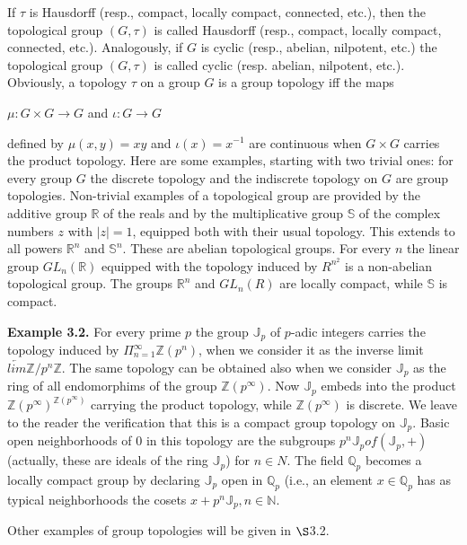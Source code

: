 \documentclass[12pt]{article}
\begin{document}
    If $ \tau $ is Hausdorff (resp., compact, locally compact, connected, etc.), then the topological group $ (G, \tau) $ is
called Hausdorff (resp., compact, locally compact, connected, etc.). Analogously, if $ G $ is cyclic (resp., abelian,
nilpotent, etc.) the topological group $ (G, \tau) $ is called cyclic (resp. abelian, nilpotent, etc.). Obviously, a topology
$ \tau $ on a group $ G $ is a group topology iff the maps 


$ \mu : G\times G \to G $ and $\iota : G \to G$


defined by $ \mu(x, y) = xy $ and $ \iota(x) = x^{-1} $ are continuous when $ G \times G $ carries the product topology.
Here are some examples, starting with two trivial ones: for every group $ G $ the discrete topology and the
indiscrete topology on $ G $ are group topologies. Non-trivial examples of a topological group are provided by the
additive group $ \mathbb{R} $ of the reals and by the multiplicative group $ \mathbb{S} $ of the complex numbers $ z $ with $ |z| = 1 $, equipped
both with their usual topology. This extends to all powers $ \mathbb{R}^n $ and $ \mathbb{S}^n$. These are abelian topological groups.
For every $ n $ the linear group $GL_n (\mathbb{R})$ equipped with the topology induced by $R^{n^2}$ is a non-abelian topological
group. The groups $\mathbb{R}^n$ and $GL_n (R)$ are locally compact, while $\mathbb{S}$ is compact.


\textbf{Example 3.2.} For every prime $ p $ the group $\mathbb{J}_p$ of $p$-adic integers carries the topology induced by $ \Pi^{\infty}_{n=1} \mathbb{Z}(p^n) $,
when we consider it as the inverse limit $\underleftarrow{lim} \mathbb{Z}/p^n \mathbb{Z}$. The same topology can be obtained also when we consider $\mathbb{J}_p$
as the ring of all endomorphims of the group $\mathbb{Z}(p^{\infty})$. Now $\mathbb{J}_p$ embeds into the product $\mathbb{Z}(p^{\infty})^{\mathbb{Z}(p^{\infty})}$ carrying the
product topology, while $\mathbb{Z}(p^{\infty})$ is discrete. We leave to the reader the verification that this is a compact group
topology on $\mathbb{J}_p$. Basic open neighborhoods of 0 in this topology are the subgroups $ p^n \mathbb{J}_p of (\mathbb{J}_p, +) $ (actually,
these are ideals of the ring $\mathbb{J}_p$) for $n \in N$. The field $\mathbb{Q}_p$ becomes a locally compact group by declaring $\mathbb{J}_p$ open
in $\mathbb{Q}_p$ (i.e., an element $x \in \mathbb{Q}_p$ has as typical neighborhoods the cosets $x + p^n \mathbb{J}_p, n \in \mathbb{N}$.


    Other examples of group topologies will be given in $\S$3.2.
\end{document}
